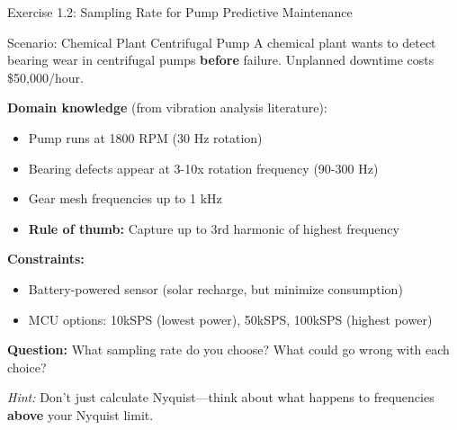 \documentclass[aspectratio=169,11pt]{beamer}
\begin{document}
\begin{frame}{Exercise 1.2: Sampling Rate for Pump Predictive Maintenance}
    \begin{block}{Scenario: Chemical Plant Centrifugal Pump}
        A chemical plant wants to detect bearing wear in centrifugal pumps \textbf{before} failure. Unplanned downtime costs \$50,000/hour.
        
        \vspace{0.2cm}
        \textbf{Domain knowledge} (from vibration analysis literature):
        \begin{itemize}
            \item Pump runs at 1800 RPM (30 Hz rotation)
            \item Bearing defects appear at 3-10x rotation frequency (90-300 Hz)
            \item Gear mesh frequencies up to 1 kHz
            \item \textbf{Rule of thumb:} Capture up to 3rd harmonic of highest frequency
        \end{itemize}
        
        \vspace{0.2cm}
        \textbf{Constraints:}
        \begin{itemize}
            \item Battery-powered sensor (solar recharge, but minimize consumption)
            \item MCU options: 10kSPS (lowest power), 50kSPS, 100kSPS (highest power)
        \end{itemize}
    \end{block}
    
    \textbf{Question:} What sampling rate do you choose? What could go wrong with each choice?
    
    {\footnotesize \textit{Hint:} Don't just calculate Nyquist---think about what happens to frequencies \textbf{above} your Nyquist limit.}
\end{frame}
\end{document}
